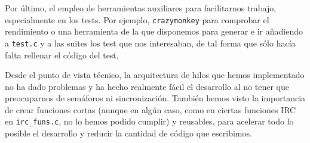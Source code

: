 \documentclass{article}
\begin{document}
Por último, el empleo de herramientas auxiliares para facilitarnos trabajo, especialmente en los tests. Por ejemplo, \texttt{crazymonkey} para comprobar el rendimiento o una herramienta de la que disponemos para generar e ir añadiendo a \texttt{test.c} y a las suites los test que nos interesaban, de tal forma que sólo hacía falta rellenar el código del test, 

Desde el punto de vista técnico, la arquitectura de hilos que hemos implementado no ha dado problemas y ha hecho realmente fácil el desarrollo al no tener que preocuparnos de semáforos ni sincronización. También hemos visto la importancia de crear funciones cortas (aunque en algún caso, como en ciertas funciones IRC en \texttt{irc\_funs.c}, no lo hemos podido cumplir) y reusables, para acelerar todo lo posible el desarrollo y reducir la cantidad de código que escribimos.
\end{document}
